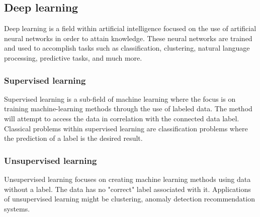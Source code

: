 \subsection{Deep learning}

Deep learning is a field within artificial intelligence focused on the use of artificial neural networks in order to attain knowledge.
These neural networks are trained and used to accomplish tasks such as classification, clustering, natural language processing, predictive tasks, and much more.

\subsubsection{Supervised learning}
Supervised learning is a sub-field of machine learning where the focus is on training
machine-learning methods through the use of labeled data.
The method will attempt to access the data in correlation with the connected data label.
Classical problems within supervised learning are classification problems where the prediction of a label is the desired result.

\subsubsection{Unsupervised learning}
Unsupervised learning focuses on creating machine learning methods using data without a label.
The data has no "correct" label associated with it.
Applications of unsupervised learning might be clustering, anomaly detection recommendation systems.

